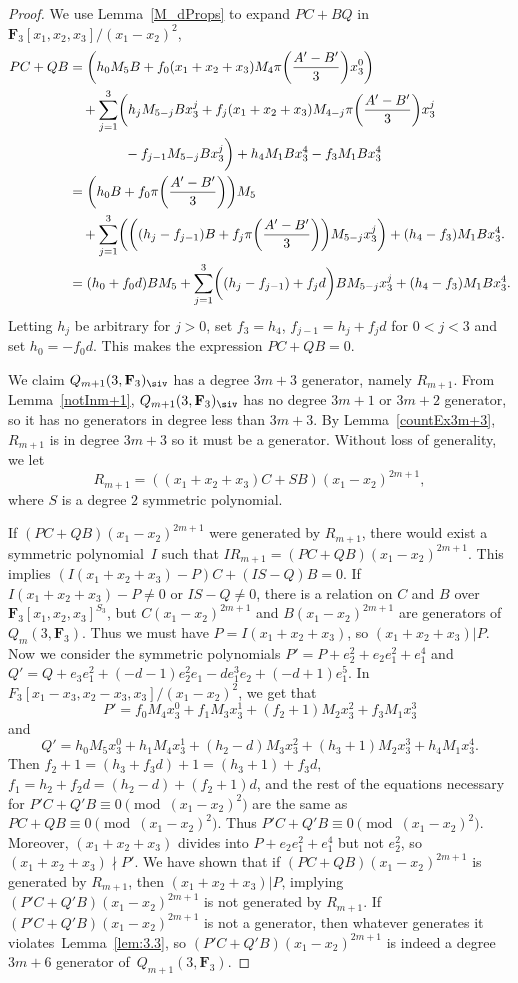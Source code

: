 \begin{proof}
 We use Lemma~\ref{M_dProps} to expand $PC+BQ$ in $\mathbf{F}_3[x_1,x_2,x_3]/(x_1-x_2)^2$,
 \begin{align*}
 PC+QB&=\biggl(h_0M_5B+f_0(x_1+x_2+x_3)M_4\pi\biggl(\frac{A'-B'}{3}\biggr)x_3^0\biggr) \\
 &\quad + \sum _{j=1}^{3}\biggl(h_{j}M_{5-j}Bx_3^j+f_{j}(x_1+x_2+x_3)M_{4-j}\pi\biggl(\frac{A'-B'}{3}\biggr)x_3^{j}\\
 &\quad\hphantom{+ \sum _{j=1}^{3}\biggl(}{}- f_{j-1}M_{5-j}Bx_3^j\bigg)+ h_4M_1Bx_3^4-f_3M_1Bx_3^4 \\
 &=\biggl(h_0B+f_0\pi\biggl(\frac{A'-B'}{3}\biggr)\biggr)M_5 \\
 &\quad + \sum _{j=1}^{3}\biggl(\biggl((h_{j} - f_{j-1})B+f_{j}\pi\biggl(\frac{A'-B'}{3}\biggr)\biggr)M_{5-j}x_3^j\biggr) + (h_4-f_3)M_1Bx_3^4. \\
 &=(h_0+f_0d)BM_5 + \sum _{j=1}^{3}\biggl((h_{j} - f_{j-1})+f_{j}d\biggr)BM_{5-j}x_3^j + (h_4-f_3)M_1Bx_3^4.
 \end{align*}
 Letting $h_j$ be arbitrary for $j>0$, set $f_3=h_4$, $f_{j-1} = h_{j}+f_jd$ for $0<j<3$ and set $h_0=-f_0d$. This makes the expression $PC+QB=0$.

 We claim $Q_{m+1}(3,\mathbf{F}_3)_{\siv}$ has a degree $3m+3$ generator, namely $R_{m+1}$. From Lemma~\ref{notInm+1}, $Q_{m+1}(3,\mathbf{F}_3)_{\siv}$ has no degree $3m+1$ or $3m+2$ generator, so it has no generators in degree less than $3m+3$. By Lemma~\ref{countEx3m+3}, $R_{m+1}$ is in degree $3m+3$ so it must be a generator. Without loss of generality, we let
 \[R_{m+1}=\left((x_1+x_2+x_3)C + SB\right)(x_1-x_2)^{2m+1},\]
 where $S$ is a degree $2$ symmetric polynomial.

 If $(PC+QB)(x_1-x_2)^{2m+1}$ were generated by $R_{m+1}$, there would exist a symmetric polynomial~$I$ such that $IR_{m+1}=(PC+QB)(x_1-x_2)^{2m+1}$. This implies $(I(x_1+x_2+x_3)-P)C+(IS-Q)B=0$. If $I(x_1+x_2+x_3)-P\neq 0$ or $IS-Q\neq 0$, there is a relation on $C$ and $B$ over $\mathbf{F}_3[x_1,x_2,x_3]^{S_3}$, but $C(x_1-x_2)^{2m+1}$ and $B(x_1-x_2)^{2m+1}$ are generators of $Q_m(3,\mathbf{F}_3)$. Thus we must have $P= I(x_1+x_2+x_3)$, so $(x_1+x_2+x_3)|P$. Now we consider the symmetric polynomials $P'=P+e_2^2+e_2e_1^2+e_1^4$ and $Q' = Q+e_3e_1^2+(-d-1)e_2^2e_1-de_1^3e_2+(-d+1)e_1^5$. In $F_3[x_1-x_3,x_2-x_3,x_3]/(x_1-x_2)^2$, we get that
 \[P'=f_0M_4x_3^0+f_1M_{3}x_3^1 + (f_{2}+1)M_2x_3^{2}+f_{3}M_1x_3^{3}\]
 and
 \[Q'=h_0M_5x_3^0+h_1M_4x_3^1+(h_2-d)M_3x_3^2+(h_3+1)M_2x_3^3+h_4M_1x_3^4.\]
 Then $f_2+1 = (h_3+f_3d)+1=(h_3+1)+f_3d$, $f_1=h_2+f_2d = (h_2-d)+(f_2+1)d$, and the rest of the equations necessary for $P'C+Q'B\equiv 0\pmod{(x_1-x_2)^2}$ are the same as $PC+QB\equiv 0\pmod{(x_1-x_2)^2}$. Thus $P'C+Q'B\equiv 0\pmod{(x_1-x_2)^2}$. Moreover, $(x_1+x_2+x_3)$ divides into $P+e_2e_1^2+e_1^4$ but not $e_2^2$, so $(x_1+x_2+x_3)\nmid P'$. We have shown that if ${(PC+QB)(x_1-x_2)^{2m+1}}$ is generated by $R_{m+1}$, then $(x_1+x_2+x_3)|P$, implying ${(P'C+Q'B)(x_1-x_2)^{2m+1}}$ is not generated by $R_{m+1}$. If $(P'C+Q'B)(x_1-x_2)^{2m+1}$ is not a generator, then whatever generates it violates~Lemma~\ref{lem:3.3}, so $(P'C+Q'B)(x_1-x_2)^{2m+1}$ is indeed a degree $3m+6$ generator of~$Q_{m+1}(3,\mathbf{F}_3)$.
 \end{proof}

